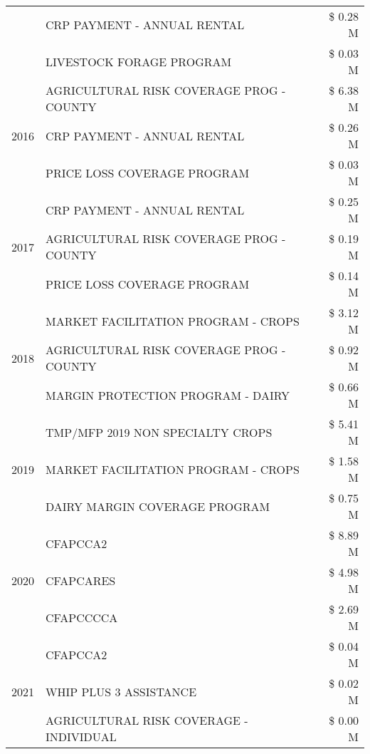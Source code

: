 \begin{tabular}{llr}
 & CRP PAYMENT - ANNUAL RENTAL & \$ 0.28 M \\
 & LIVESTOCK FORAGE PROGRAM & \$ 0.03 M \\
\cline{1-3}
\multirow[t]{3}{*}{2016} & AGRICULTURAL RISK COVERAGE PROG - COUNTY & \$ 6.38 M \\
 & CRP PAYMENT - ANNUAL RENTAL & \$ 0.26 M \\
 & PRICE LOSS COVERAGE PROGRAM & \$ 0.03 M \\
\cline{1-3}
\multirow[t]{3}{*}{2017} & CRP PAYMENT - ANNUAL RENTAL & \$ 0.25 M \\
 & AGRICULTURAL RISK COVERAGE PROG - COUNTY & \$ 0.19 M \\
 & PRICE LOSS COVERAGE PROGRAM & \$ 0.14 M \\
\cline{1-3}
\multirow[t]{3}{*}{2018} & MARKET FACILITATION PROGRAM - CROPS & \$ 3.12 M \\
 & AGRICULTURAL RISK COVERAGE PROG - COUNTY & \$ 0.92 M \\
 & MARGIN PROTECTION PROGRAM - DAIRY & \$ 0.66 M \\
\cline{1-3}
\multirow[t]{3}{*}{2019} & TMP/MFP 2019 NON SPECIALTY CROPS & \$ 5.41 M \\
 & MARKET FACILITATION PROGRAM - CROPS & \$ 1.58 M \\
 & DAIRY MARGIN COVERAGE PROGRAM & \$ 0.75 M \\
\cline{1-3}
\multirow[t]{3}{*}{2020} & CFAPCCA2 & \$ 8.89 M \\
 & CFAPCARES & \$ 4.98 M \\
 & CFAPCCCCA & \$ 2.69 M \\
\cline{1-3}
\multirow[t]{3}{*}{2021} & CFAPCCA2 & \$ 0.04 M \\
 & WHIP PLUS 3 ASSISTANCE & \$ 0.02 M \\
 & AGRICULTURAL RISK COVERAGE - INDIVIDUAL & \$ 0.00 M \\
\cline{1-3}
\bottomrule
\end{tabular}

